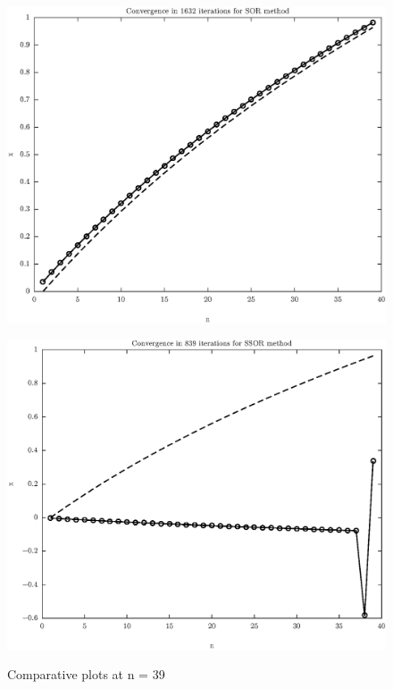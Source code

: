 \documentclass[11pt]{article}
\begin{document}
\begin{figure}
\begin{minipage}{.45\textwidth}
\label{fig:test2}
\end{minipage}\hfill
\\
\begin{minipage}{.45\textwidth}
\centering
\includegraphics[width=\linewidth]{math609_pa2_comp_example_1_n_39_k_SOR_part_a.eps}
\label{fig:test3}
\end{minipage}\hfill
\begin{minipage}{.45\textwidth}
\centering
\includegraphics[width=\linewidth]{math609_pa2_comp_example_1_n_39_k_SSOR_part_a.eps}
\label{fig:test3}
\end{minipage}\hfill
\caption{Comparative plots at n = 39}
\end{figure}
\end{document}
